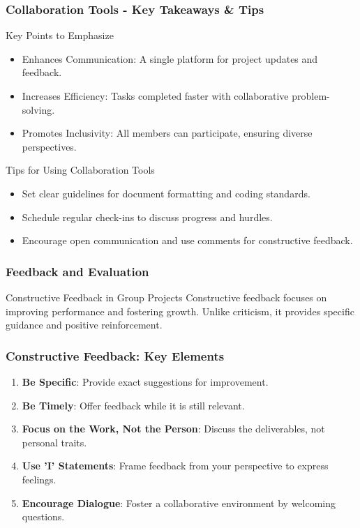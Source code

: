 \documentclass[aspectratio=169]{beamer}
\begin{document}
\begin{frame}[fragile]
    \frametitle{Collaboration Tools - Key Takeaways & Tips}
    \begin{block}{Key Points to Emphasize}
        \begin{itemize}
            \item Enhances Communication: A single platform for project updates and feedback.
            \item Increases Efficiency: Tasks completed faster with collaborative problem-solving.
            \item Promotes Inclusivity: All members can participate, ensuring diverse perspectives.
        \end{itemize}
    \end{block}

    \begin{block}{Tips for Using Collaboration Tools}
        \begin{itemize}
            \item Set clear guidelines for document formatting and coding standards.
            \item Schedule regular check-ins to discuss progress and hurdles.
            \item Encourage open communication and use comments for constructive feedback.
        \end{itemize}
    \end{block}
\end{frame}

\begin{frame}[fragile]
    \frametitle{Feedback and Evaluation}
    \begin{block}{Constructive Feedback in Group Projects}
        Constructive feedback focuses on improving performance and fostering growth. Unlike criticism, it provides specific guidance and positive reinforcement.
    \end{block}
\end{frame}

\begin{frame}[fragile]
    \frametitle{Constructive Feedback: Key Elements}
    \begin{enumerate}
        \item \textbf{Be Specific}: Provide exact suggestions for improvement.
        \item \textbf{Be Timely}: Offer feedback while it is still relevant.
        \item \textbf{Focus on the Work, Not the Person}: Discuss the deliverables, not personal traits.
        \item \textbf{Use 'I' Statements}: Frame feedback from your perspective to express feelings.
        \item \textbf{Encourage Dialogue}: Foster a collaborative environment by welcoming questions.
    \end{enumerate}
\end{frame}
\end{document}
